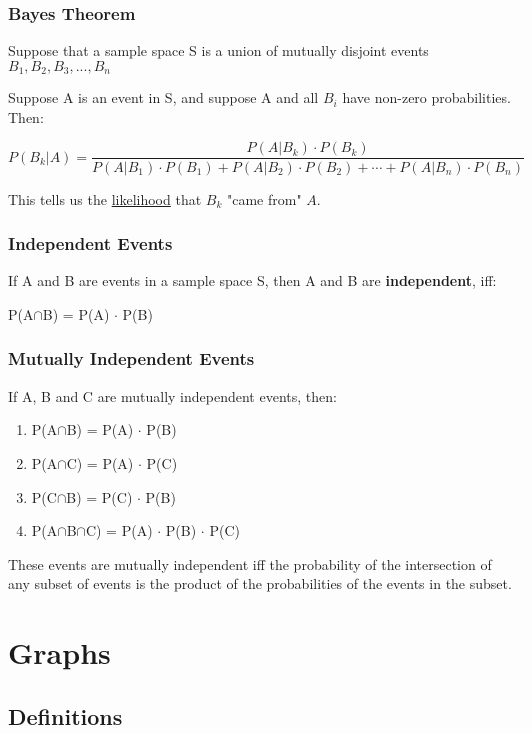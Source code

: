 \documentclass{article}
\begin{document}
\subsubsection{Bayes Theorem}
Suppose that a sample space S is a union of mutually disjoint events $B_1, B_2, B_3, ..., B_n$

Suppose A is an event in S, and suppose A and all $B_i$ have non-zero probabilities. Then:

\[
P(B_k | A) = \frac{P(A | B_k) \cdot P(B_k)}{P(A | B_1) \cdot P(B_1) + P(A | B_2) \cdot P(B_2) + \cdots + P(A | B_n) \cdot P(B_n)}
\]

This tells us the \underline{likelihood} that $B_k$ "came from" $A$.

\subsubsection{Independent Events}
If A and B are events in a sample space S, then A and B are \textbf{independent}, iff:
\begin{center}
    P(A$\cap$B) = P(A) $\cdot$ P(B)
\end{center}

\subsubsection{Mutually Independent Events}
If A, B and C are mutually independent events, then:
\begin{enumerate}
    \item P(A$\cap$B) = P(A) $\cdot$ P(B)
    \item P(A$\cap$C) = P(A) $\cdot$ P(C)
    \item P(C$\cap$B) = P(C) $\cdot$ P(B)
    \item P(A$\cap$B$\cap$C) = P(A) $\cdot$ P(B) $\cdot$ P(C)
\end{enumerate}
These events are mutually independent iff the probability of the intersection of any subset of events is the product of the probabilities of the events in the subset.

\section{Graphs}
\subsection{Definitions}
\end{document}

